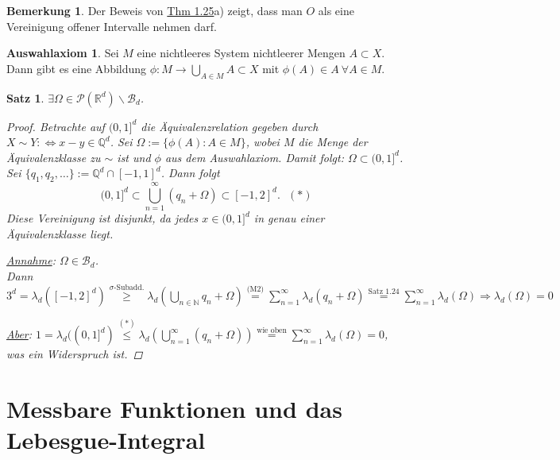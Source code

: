\documentclass[a4paper]{scrreprt}
\newcommand{\PowerSet}{\mathcal{P}}
\newcommand{\R}{\mathbb{R}}
\newcommand{\N}{\mathbb{N}}
\newcommand{\Q}{\mathbb{Q}}
\newcommand{\Borel}{\mathcal{B}}
\newcommand{\Bd}{\Borel_d}
\newcommand{\jlabel}[1]{\label{j_#1}}
\newcommand{\jshortlink}[1]{\jhyperref{#1}{\text{#1}}}
\newcommand{\jhyperref}[2]{\hyperref[j_#1]{#2}}
\newcommand{\jlink}[1]{\jhyperref{#1}{#1}}
\newcommand{\jspacesmall}{\vspace{4pt}}
\theoremstyle{plain}
\newtheorem{satz}[thm]{Satz}
\theoremstyle{definition}
\newtheorem*{bem*}{Bemerkung}
\newtheorem*{auswahlaxiom}{Auswahlaxiom}
\begin{document}
{{{\begin{bem*}
    Der Beweis von \jlink{Thm 1.25}a) zeigt, dass man $O$ als eine Vereinigung offener Intervalle nehmen darf.
\end{bem*}

\begin{auswahlaxiom}
    Sei $M$ eine nichtleeres System nichtleerer Mengen $A\subset X$.\\
    Dann gibt es eine Abbildung $\phi: M \rightarrow \bigcup_{A\in M} A \subset X$ mit $\phi(A) \in A \ \forall A\in M$.
\end{auswahlaxiom}

\begin{satz}
\jlabel{Satz 1.26}
    $\exists \Omega \in \PowerSet(\R^d) \backslash \Bd$.
    \begin{proof}
        Betrachte auf $(0,1]^d$ die Äquivalenzrelation gegeben durch $X\sim Y :\Leftrightarrow x-y \in \Q^d$. Sei $\Omega := \{\phi(A) : A \in M\}$, wobei $M$ die Menge der Äquivalenzklasse zu $\sim$ ist und $\phi$ aus dem Auswahlaxiom. Damit folgt: $\Omega \subset (0,1]^d$.\\
        Sei $\{q_1, q_2, \dots\} := \Q^d \cap [-1,1]^d$. Dann folgt
        \begin{displaymath}
            (0,1]^d \subset \bigcup_{n=1}^\infty (q_n + \Omega) \subset [-1,2]^d. \ \ \ (*)
        \end{displaymath}
        Diese Vereinigung ist disjunkt, da jedes $x\in (0,1]^d$ in genau einer Äquivalenzklasse liegt.
        
        \jspacesmall
        
        \uline{Annahme}: $\Omega \in \Bd$.\\
            Dann $3^d = \lambda_d([-1,2]^d) \overset{\sigma\text{-Subadd.}}{\ge} \lambda_d(\bigcup_{n\in\N} q_n + \Omega) \overset{\text{(M2)}}{=} \sum_{n=1}^\infty \lambda_d(q_n + \Omega) \overset{\jshortlink{Satz 1.24}}{=} \sum_{n=1}^\infty \lambda_d(\Omega) \Rightarrow \lambda_d(\Omega) = 0$
            
        \jspacesmall
            
        \uline{Aber}: $1 = \lambda_d((0,1]^d) \overset{(*)}{\le} \lambda_d(\bigcup_{n=1}^\infty (q_n + \Omega)) \overset{\text{wie oben}}{=} \sum_{n=1}^\infty \lambda_d(\Omega) = 0$, was ein Widerspruch ist.
    \end{proof}
\end{satz}


\chapter{Messbare Funktionen und das Lebesgue-Integral}

}}}
\end{document}
